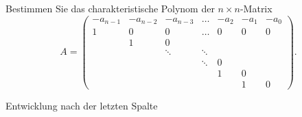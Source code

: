 Bestimmen Sie das charakteristische Polynom der $n\times n$-Matrix
\[
A=\begin{pmatrix}
-a_{n-1}&-a_{n-2}&-a_{n-3}&\dots & -a_2 & -a_1 & -a_0 \\
   1    &   0    &   0    &\dots &   0  &   0  &   0  \\
        &   1    &   0    &      &      &      &      \\
        &        &\ddots  &\ddots&      &      &      \\
        &        &        &\ddots&   0  &      &      \\
        &        &        &      &   1  &   0  &      \\
        &        &        &      &      &   1  &   0  
\end{pmatrix}.
\]


\begin{hinweis}Entwicklung nach der letzten Spalte
\end{hinweis}

